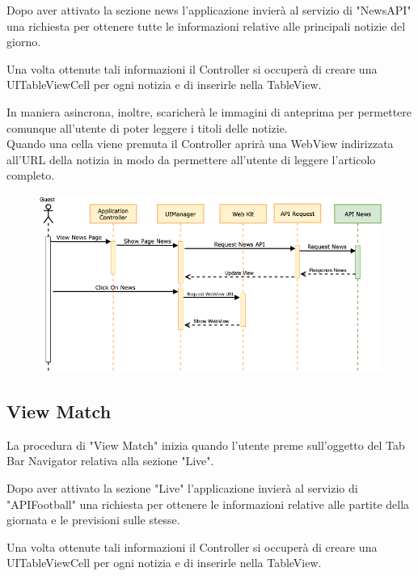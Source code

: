 \documentclass[numbers=noenddot, 12pt, a4paper, oneside]{scrbook}
\begin{document}
Dopo aver attivato la sezione news l'applicazione invierà al servizio di "NewsAPI" una richiesta per ottenere tutte le informazioni relative alle principali notizie del giorno.

Una volta ottenute tali informazioni il Controller si occuperà di creare una UITableViewCell per ogni notizia e di inserirle nella TableView.

In maniera asincrona, inoltre, scaricherà le immagini di anteprima per permettere comunque all'utente di poter leggere i titoli delle notizie.\\
Quando una cella viene premuta il Controller aprirà una WebView indirizzata all'URL della notizia in modo da permettere all'utente di leggere l'articolo completo.
\begin{figure}[H]
	\centering
	\includegraphics[width=1\textwidth]{images/Sequence/SequenceNews}
\end{figure}


\newpage
\subsection*{View Match}
La procedura di "View Match" inizia quando l'utente preme sull'oggetto del Tab Bar Navigator relativa alla sezione "Live".

Dopo aver attivato la sezione "Live" l'applicazione invierà al servizio di "APIFootball" una richiesta per ottenere le informazioni relative alle partite della giornata e le previsioni sulle stesse.

Una volta ottenute tali informazioni il Controller si occuperà di creare una UITableViewCell per ogni notizia e di inserirle nella TableView.
\end{document}
